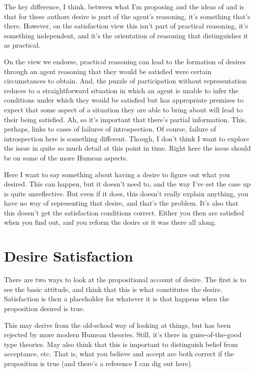 \documentclass[10pt]{article}
\begin{document}
{\color{red}
  The key difference, I think, between what I'm proposing and the ideas of \citeauthor{Pettit:1990aa} and \citeauthor{Schroeder:2007aa} is that for these authors desire is part of the agent's reasoning, it's something that's there.
  However, on the satisfaction view this isn't part of practical reasoning, it's something independent, and it's the orientation of reasoning that distinguishes it as practical.
}


On the view we endorse, practical reasoning can lead to the formation of desires through an agent reasoning that they would be satisfied were certain circumstances to obtain.
And, the puzzle of participation without representation reduces to a straightforward situation in which an agent is unable to infer the conditions under which they would be satisfied but has appropriate premises to expect that some aspect of a situation they are able to bring about will lead to their being satisfied.
{\color{red}
  Ah, so it's important that there's partial information.
  This, perhaps, links to cases of failures of introspection.
  Of course, failure of introspection here is something different.
  Though, I don't think I want to explore the issue in quite so much detail at this point in time.
  Right here the issue should be on some of the more Humean aspects.
}



{\color{red}
  Here I want to say something about having a desire to figure out what you desired.
  This can happen, but it doesn't need to, and the way I've set the case up is quite unreflective.
  But even if it does, this doesn't really explain anything, you have no way of representing that desire, and that's the problem.
  It's also that this doesn't get the satisfaction conditions correct.
  Either you then are satisfied when you find out, and you reform the desire or it was there all along.
}

\section{Desire Satisfaction}
\label{sec:desire-satisfaction}

There are two ways to look at the propositional account of desire.
The first is to see the basic attitude, and think that this is what constitutes the desire.
Satisfaction is then a placeholder for whatever it is that happens when the proposition desired is true.

This may derive from the old-school way of looking at things, but has been rejected by more modern Humean theories.
Still, it's there in guise-of-the-good type theories.
May also think that this is important to distinguish belief from acceptance, etc.
That is, what you believe and accept are both correct if the proposition is true (and there's a reference I can dig out here).
\end{document}
